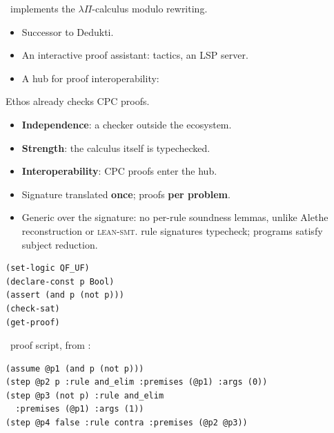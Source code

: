 \documentclass[handout, t, lualatex, compress, 11pt]{beamer}
\begin{document}
\begin{frame}{\secheader}%
	\lpname\ implements the $λΠ$-calculus modulo rewriting.
	\gap
	\begin{itemize}
		\item<+-> Successor to Dedukti.
		\item<+-> An interactive proof assistant: tactics, an LSP server.
		\item<+-> A hub for proof interoperability:
	\end{itemize}
	\vfill
	\centerline{\interopfig}
\end{frame}


\begin{frame}{\secheader}%
	Ethos already checks CPC proofs.
	\gap
	\begin{itemize}
		\item<+-> \textbf{Independence}: a checker outside the
		       ecosystem.
		\item<+-> \textbf{Strength}: the calculus itself is
		      typechecked.
		\item<+-> \textbf{Interoperability}: CPC proofs enter the hub.
	\end{itemize}
\end{frame}


\begin{frame}{\secheader}%
	\begin{center}
		\pipelinefig
	\end{center}
	\begin{itemize}
		\item<+-> Signature translated \textbf{once}; proofs
		      \textbf{per problem}.
		\item<+-> Generic over the signature: no per-rule soundness
		      lemmas, unlike Alethe reconstruction or \textsc{lean-smt}.
		\claim<+-> rule signatures typecheck;
		\claim<+-> programs satisfy subject reduction.
	\end{itemize}
\end{frame}


\begin{frame}[fragile]{\secheader}%
	\begin{plainbox}
	\begin{lstlisting}[style=smt2, basicstyle=\lpmono\footnotesize]
(set-logic QF_UF)
(declare-const p Bool)
(assert (and p (not p)))
(check-sat)
(get-proof)\end{lstlisting}
	\end{plainbox}
	\onslide<+->
		\eoname\ proof script, from :
		\begin{eobox}
		\begin{lstlisting}[basicstyle=\lpmono\footnotesize]
(assume @p1 (and p (not p)))
(step @p2 p :rule and_elim :premises (@p1) :args (0))
(step @p3 (not p) :rule and_elim
  :premises (@p1) :args (1))
(step @p4 false :rule contra :premises (@p2 @p3))\end{lstlisting}
		\end{eobox}
\end{frame}
\end{document}
